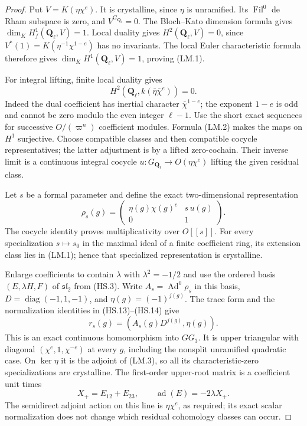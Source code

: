 \documentclass[11pt,a4paper]{article}
\theoremstyle{definition}
\begin{document}
\begin{proof}
Put $V=K(\eta\chi^e)$.  It is crystalline, since
$\eta$ is unramified.  Its $\operatorname{Fil}^0$
de Rham subspace is zero, and $V^{G_{\mathbf Q_\ell}}=0$.
The Bloch--Kato dimension formula gives
$\dim_KH^1_f(\mathbf Q_\ell,V)=1$.
Local duality gives $H^2(\mathbf Q_\ell,V)=0$, since
$V^*(1)=K(\eta^{-1}\chi^{1-e})$ has no invariants.
The local Euler characteristic formula therefore
gives $\dim_KH^1(\mathbf Q_\ell,V)=1$, proving (LM.1).

For integral lifting, finite local duality gives
\[
 H^2(\mathbf Q_\ell,k(\bar\eta\bar\chi^e))=0.            \tag{LM.2}
\]
Indeed the dual coefficient has inertial character
$\bar\chi^{1-e}$; the exponent $1-e$ is odd and
cannot be zero modulo the even integer $\ell-1$.
Use the short exact sequences for successive
$O/(\varpi^n)$ coefficient modules.  Formula (LM.2)
makes the maps on $H^1$ surjective.  Choose compatible
classes and then compatible cocycle representatives;
the latter adjustment is by a lifted zero-cochain.
Their inverse limit is a continuous integral cocycle
$u:G_{\mathbf Q_\ell}\to O(\eta\chi^e)$ lifting the
given residual class.

Let $s$ be a formal parameter and define the exact
two-dimensional representation
\[
 \rho_s(g)=
 \begin{pmatrix}
  \eta(g)\chi(g)^e&s\,u(g)\\0&1
 \end{pmatrix}.                                           \tag{LM.3}
\]
The cocycle identity proves multiplicativity over
$O[[s]]$.  For every specialization $s\mapsto s_0$
in the maximal ideal of a finite coefficient ring,
its extension class lies in (LM.1); hence that
specialized representation is crystalline.

Enlarge coefficients to contain $\lambda$ with
$\lambda^2=-1/2$ and use the ordered basis
$(E,\lambda H,F)$ of $\mathfrak{sl}_2$ from (HS.3).
Write $A_s=\operatorname{Ad}^0\rho_s$ in this basis,
$D=\operatorname{diag}(-1,1,-1)$, and
$\eta(g)=(-1)^{j(g)}$.  The trace form and the
normalization identities in (HS.13)--(HS.14) give
\[
 r_s(g)=(A_s(g)D^{j(g)},\eta(g)).                          \tag{LM.4}
\]
This is an exact continuous homomorphism into $GG_3$.
It is upper triangular with diagonal
$(\chi^e,1,\chi^{-e})$ at every $g$, including the
nonsplit unramified quadratic case.  On $\ker\eta$
it is the adjoint of (LM.3), so all its
characteristic-zero specializations are crystalline.
The first-order upper-root matrix is a coefficient
unit times
\[
 X_+=E_{12}+E_{23},\qquad
 \operatorname{ad}(E)=-2\lambda X_+.                      \tag{LM.5}
\]
The semidirect adjoint action on this line is
$\eta\chi^e$, as required; its exact scalar
normalization does not change which residual
cohomology classes can occur.


\end{proof}
\end{document}
